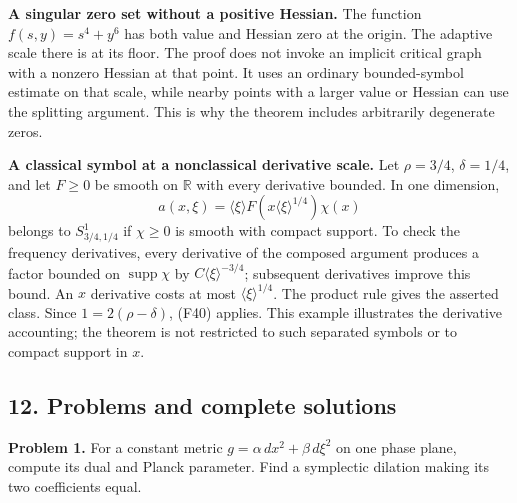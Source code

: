 \documentclass[
  11pt,
]{article}
\makeatletter
\let\ReaderOriginalAnchorStart\hyper@anchorstart
\let\ReaderOriginalAnchorEnd\hyper@anchorend
\let\ReaderPendingAliases\@empty
\def\ReaderArmAliases#1{\gdef\ReaderPendingAliases{#1}}
\def\hyper@anchorstart#1{\ReaderIfNativeAnchorTF{#1}{\ReaderPendingAliases\global\let\ReaderPendingAliases\@empty}{}\ReaderOriginalAnchorStart{#1}}
\makeatother
\begin{document}
\textbf{A singular zero set without a positive Hessian.} The function
\(f(s,y)=s^4+y^6\) has both value and Hessian zero at the origin. The
adaptive scale there is at its floor. The proof does not invoke an
implicit critical graph with a nonzero Hessian at that point. It uses an
ordinary bounded-symbol estimate on that scale, while nearby points with
a larger value or Hessian can use the splitting argument. This is why
the theorem includes arbitrarily degenerate zeros.

\textbf{A classical symbol at a nonclassical derivative scale.} Let
\(\rho=3/4\), \(\delta=1/4\), and let \(F\geq0\) be smooth on
\(\mathbb R\) with every derivative bounded. In one dimension, \[
a(x,\xi)=\langle\xi\rangle
 F(x\langle\xi\rangle^{1/4})\chi(x)
\tag{F50}
\] belongs to \(S_{3/4,1/4}^{1}\) if \(\chi\geq0\) is smooth with
compact support. To check the frequency derivatives, every derivative of
the composed argument produces a factor bounded on
\(\operatorname{supp}\chi\) by \(C\langle\xi\rangle^{-3/4}\); subsequent
derivatives improve this bound. An \(x\) derivative costs at most
\(\langle\xi\rangle^{1/4}\). The product rule gives the asserted class.
Since \(1=2(\rho-\delta)\), (F40) applies. This example illustrates the
derivative accounting; the theorem is not restricted to such separated
symbols or to compact support in \(x\).

\ReaderArmAliases{\ReaderOriginalAnchorStart{AN03-SFQ-001}\ReaderOriginalAnchorEnd\begingroup\expandafter\def\csname @currentHref\endcsname{AN03-SFQ-001}\label{AN03-SFQ-001}\endgroup\ReaderOriginalAnchorStart{an03-sfq-001-problems-and-complete-solutions}\ReaderOriginalAnchorEnd\begingroup\expandafter\def\csname @currentHref\endcsname{an03-sfq-001-problems-and-complete-solutions}\label{an03-sfq-001-problems-and-complete-solutions}\endgroup\ReaderOriginalAnchorStart{12-problems-and-complete-solutions}\ReaderOriginalAnchorEnd\begingroup\expandafter\def\csname @currentHref\endcsname{12-problems-and-complete-solutions}\label{12-problems-and-complete-solutions}\endgroup\ReaderOriginalAnchorStart{problems-and-complete-solutions}\ReaderOriginalAnchorEnd}
\subsection{12. Problems and complete
solutions}\label{problems-and-complete-solutions}

\textbf{Problem 1.} For a constant metric
\(g=\alpha\,dx^2+\beta\,d\xi^2\) on one phase plane, compute its dual
and Planck parameter. Find a symplectic dilation making its two
coefficients equal.
\end{document}
